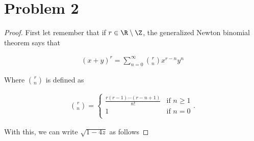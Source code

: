﻿\chapter{Problem 2}

\begin{proof}
    First let remember that if $r \in \R \setminus \Z$, the generalized Newton binomial theorem says that
    
    \begin{align}
            (x + y)^r = \sum_{n = 0}^{\infty} \binom{r}{n} x^{r-n} y^{n}
    \end{align}\pn
    
    Where $\binom{r}{n}$ is defined as
    
    \begin{align}
            \binom{r}{n} = \begin{cases}
                                \frac{r(r-1)\cdots(r-n+1)}{n!} & \text{if } n \geq 1   \\
                                1                              & \text{if } n = 0   \\
                           \end{cases}.
    \end{align}\pn
    
    
    
    With this, we can write $\sqrt{1 - 4z}$ as follows
    

\end{proof}

